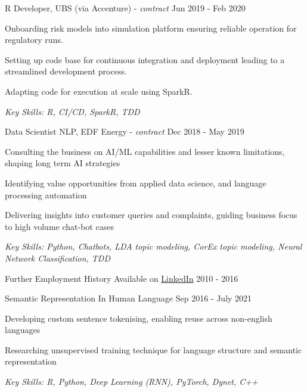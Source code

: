 \documentclass[11pt,article,oneside]{memoir}
\newenvironment{itemize*}{%
  \renewcommand\labelitemi{\textbullet}
  \footnotesize
  \begin{itemize}%
    \setlength{\itemsep}{0pt}}%
  {\end{itemize}
}
\begin{document}
\normalsize
\medskip
\ind R Developer, UBS (via Accenture) - \emph{contract} \hfill Jun 2019 - Feb 2020
\begin{itemize*}
    \item Onboarding risk models into simulation platform ensuring reliable operation for regulatory runs.
    \item Setting up code base for continuous integration and deployment leading to a streamlined development process.
    \item Adapting code for execution at scale using SparkR.
\end{itemize*}
\ind \hspace{0.35in} \footnotesize \emph{Key Skills: R, CI/CD, SparkR, TDD}

\normalsize
\medskip
\ind Data Scientist NLP, EDF Energy - \emph{contract} \hfill Dec 2018 - May 2019
\begin{itemize*}
    \item Consulting the business on AI/ML capabilities and lesser known limitations, shaping long term AI strategies
    \item Identifying value opportunities from applied data science, and language processing automation
    \item Delivering insights into customer queries and complaints, guiding business focus to high volume chat-bot cases
\end{itemize*}
\ind \hspace{0.35in} \footnotesize \emph{Key Skills: Python, Chatbots, LDA topic modeling, CorEx topic modeling, Neural Network Classification, TDD }

\normalsize
\medskip
\ind Further Employment History Available on \href{https://uk.linkedin.com/in/adrian-ionita-6a923129}{LinkedIn} \hfill 2010 - 2016


\normalsize
\medskip
\ind Semantic Representation In Human Language \hfill Sep 2016 - July 2021
\begin{itemize*}
  \item Developing custom sentence tokenising, enabling reuse across non-english languages
  \item Researching unsupervised training technique for language structure and semantic representation
\end{itemize*}
\ind \hspace{0.35in} \footnotesize \emph{Key Skills: R, Python, Deep Learning (RNN), PyTorch, Dynet, C++}
\end{document}
